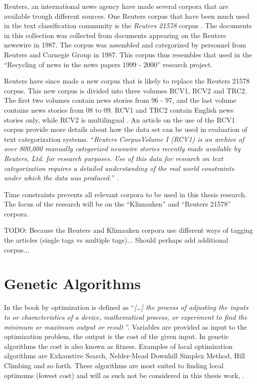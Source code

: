 Reuters, an international news agency have made several corpora that are available trough different sources. One Reuters corpus that have been much used in the text classification community is the \textit{Reuters 21578} corpus \cite{Lewis2004a}. The documents in this collection was collected from documents appearing on the Reuters newswire in 1987. The corpus was assembled and categorized by personnel from Reuters and Carnegie Group in 1987. This corpus thus resembles that used in the ``Recycling of news in the news papers 1999 - 2000'' research project.

Reuters have since made a new corpus that is likely to replace the Reuters 21578 corpus. This new corpus is divided into three volumes RCV1, RCV2 and TRC2. The first two volumes contain news stories from 96 - 97, and the last volume contains news stories from 08 to 09. RCV1 and TRC2 contain English news stories only, while RCV2 is multilingual \cite{NationalInstituteofStandardsandTechnology2004}. An article on the use of the RCV1 corpus provide more details about how the data set can be used in evaluation of text categorization systems. ``\textit{Reuters CorpusVolume I (RCV1) is an archive of over 800,000 manually categorized newswire stories recently made available by Reuters, Ltd. for research purposes. Use of this data for research on text categorization requires a detailed understanding of the real world constraints under which the data was produced.}'' \cite{Lewis2004}. 

Time constraints prevents all relevant corpora to be used in this thesis research. The focus of the research will be on the ``Klimauken'' and ``Reuters 21578'' corpora. 

TODO: Because the Reuters and Klimauken corpora use different ways of tagging the articles (single tags vs multiple tags)... Should perhaps add additional corpus...


\section{Genetic Algorithms}
\label{GeneticAlgorithm}
In the book  by \cite{Haupt2004} optimization is defined as ``\textit{[\dots] the process of adjusting the inputs to or characteristics of a device, mathematical process, or experiment to find the minimum or maximum output or result }''. Variables are provided as input to the optimization problem, the output is the cost of the given input. In genetic algorithms the cost is also known as fitness. Examples of local optimization algorithms are Exhaustive Search, Nelder-Mead Downhill Simplex Method, Hill Climbing and so forth. These algorithms are most suited to finding local optimums (lowest cost) and will as such not be considered in this thesis work, \parencite{Haupt2004}.

